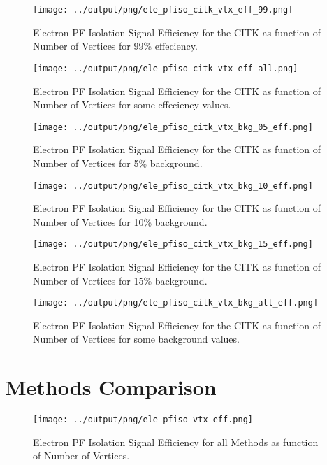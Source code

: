 \documentclass[11pt]{book}
\begin{document}
\begin{figure}[htb]
\centering
\texttt{[image: ../output/png/ele\_pfiso\_citk\_vtx\_eff\_99.png]}
\caption{Electron PF Isolation Signal Efficiency for the CITK as function of Number of Vertices for 99\% effeciency.}
\label{fig:ele_pfiso_vtx_eff_citk_eff_99}
\end{figure}

\begin{figure}[htb]
\centering
\texttt{[image: ../output/png/ele\_pfiso\_citk\_vtx\_eff\_all.png]}
\caption{Electron PF Isolation Signal Efficiency for the CITK as function of Number of Vertices for some effeciency values.}
\label{fig:ele_pfiso_vtx_eff_citk_eff_all}
\end{figure}

\begin{figure}[htb]
\centering
\texttt{[image: ../output/png/ele\_pfiso\_citk\_vtx\_bkg\_05\_eff.png]}
\caption{Electron PF Isolation Signal Efficiency for the CITK as function of Number of Vertices for 5\% background.}
\label{fig:ele_pfiso_vtx_eff_citk_bkg_05_eff}
\end{figure}

\begin{figure}[htb]
\centering
\texttt{[image: ../output/png/ele\_pfiso\_citk\_vtx\_bkg\_10\_eff.png]}
\caption{Electron PF Isolation Signal Efficiency for the CITK as function of Number of Vertices for 10\% background.}
\label{fig:ele_pfiso_vtx_eff_citk_bkg_10_eff}
\end{figure}

\begin{figure}[htb]
\centering
\texttt{[image: ../output/png/ele\_pfiso\_citk\_vtx\_bkg\_15\_eff.png]}
\caption{Electron PF Isolation Signal Efficiency for the CITK as function of Number of Vertices for 15\% background.}
\label{fig:ele_pfiso_vtx_eff_citk_bkg_15_eff}
\end{figure}

\begin{figure}[htb]
\centering
\texttt{[image: ../output/png/ele\_pfiso\_citk\_vtx\_bkg\_all\_eff.png]}
\caption{Electron PF Isolation Signal Efficiency for the CITK as function of Number of Vertices for some background values.}
\label{fig:ele_pfiso_vtx_eff_citk_bkg_all_eff}
\end{figure}
\clearpage

\section{Methods Comparison}
\begin{figure}[htb]
\centering
\texttt{[image: ../output/png/ele\_pfiso\_vtx\_eff.png]}
\caption{Electron PF Isolation Signal Efficiency for all Methods as function of Number of Vertices.}
\label{fig:ele_pfiso_vtx_eff}
\end{figure}
\end{document}
